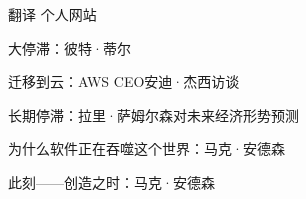 

\begin{cventries}

  \cventry
    {翻译} %
    {个人网站} %
    {} %
    {} %
    {
      \begin{cvitems} %
        \item {大停滞：彼特·蒂尔}
        \item {迁移到云：AWS CEO安迪·杰西访谈}
        \item {长期停滞：拉里·萨姆尔森对未来经济形势预测}
        \item {为什么软件正在吞噬这个世界：马克·安德森}
        \item {此刻——创造之时：马克·安德森}
      \end{cvitems}
    }

\end{cventries}
